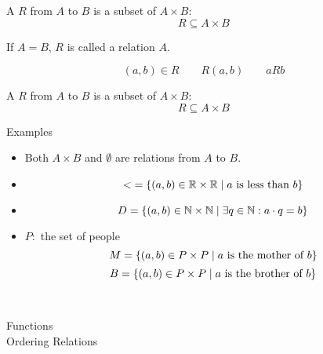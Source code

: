 
\begin{frame}{}
  \begin{definition}[Relations]
    A  $R$ from $A$ to $B$ is a subset of $A \times B$:
    \[
      {R \subseteq A \times B}
    \]
  \end{definition}

  \pause
  \begin{center}
    If $A = B$, $R$ is called a relation  $A$.
  \end{center}

  \pause
  \begin{definition}[Notations]
    \[
      (a, b) \in R \qquad R(a, b) \qquad a R b
    \]
  \end{definition}
\end{frame}

\begin{frame}{}
  \begin{definition}[Relations]
    A  $R$ from $A$ to $B$ is a subset of $A \times B$:
    \[
      {R \subseteq A \times B}
    \]
  \end{definition}

  \begin{exampleblock}{Examples}
    \pause
    \begin{itemize}[<+->]
      \item Both $A \times B$ and $\emptyset$ are relations from $A$ to $B$.
      \item 
	\[
	  <\; = \{(a, b) \in \mathbb{R} \times \mathbb{R} \mid a \text{ is less than } b\}
	\]
      \item 
	\[
	  D = \{(a, b) \in \mathbb{N} \times \mathbb{N} \mid \exists q \in \mathbb{N}: a \cdot q = b\}
	\]
      \item $P:$ the set of people
	\[
	  M = \{(a, b) \in P \times P \mid a \text{ is the mother of } b\}
	\]
	\[
	  B = \{(a, b) \in P \times P \mid a \text{ is the brother of } b\}
	\]
    \end{itemize}
  \end{exampleblock}
\end{frame}

\begin{frame}{}
  \begin{center}
  \end{center}

  \begin{columns}
      \begin{center}
	  \\[10pt]
	Functions  \\[10pt]
	Ordering Relations  
      \end{center}
  \end{columns}
\end{frame}

